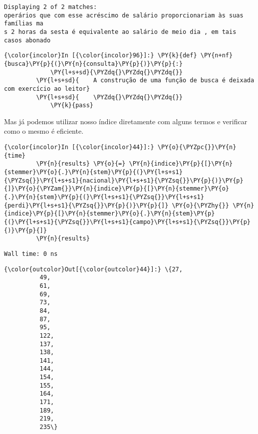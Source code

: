     \begin{Verbatim}[commandchars=\\\{\}]
Displaying 2 of 2 matches:
operários que com esse acréscimo de salário proporcionariam às suas famílias ma
s 2 horas da sesta é equivalente ao salário de meio dia , em tais casos abonado

    \end{Verbatim}

    \begin{Verbatim}[commandchars=\\\{\}]
{\color{incolor}In [{\color{incolor}96}]:} \PY{k}{def} \PY{n+nf}{busca}\PY{p}{(}\PY{n}{consulta}\PY{p}{)}\PY{p}{:}
             \PY{l+s+sd}{\PYZdq{}\PYZdq{}\PYZdq{}}
         \PY{l+s+sd}{    A construção de uma função de busca é deixada com exercício ao leitor}
         \PY{l+s+sd}{    \PYZdq{}\PYZdq{}\PYZdq{}}
             \PY{k}{pass}
\end{Verbatim}

    Mas já podemos utilizar nosso índice diretamente com alguns termos e
verificar como o mesmo é eficiente.

    \begin{Verbatim}[commandchars=\\\{\}]
{\color{incolor}In [{\color{incolor}44}]:} \PY{o}{\PYZpc{}}\PY{n}{time}
         \PY{n}{results} \PY{o}{=} \PY{n}{indice}\PY{p}{[}\PY{n}{stemmer}\PY{o}{.}\PY{n}{stem}\PY{p}{(}\PY{l+s+s1}{\PYZsq{}}\PY{l+s+s1}{nacional}\PY{l+s+s1}{\PYZsq{}}\PY{p}{)}\PY{p}{]}\PY{o}{\PYZam{}}\PY{n}{indice}\PY{p}{[}\PY{n}{stemmer}\PY{o}{.}\PY{n}{stem}\PY{p}{(}\PY{l+s+s1}{\PYZsq{}}\PY{l+s+s1}{perdi}\PY{l+s+s1}{\PYZsq{}}\PY{p}{)}\PY{p}{]} \PY{o}{\PYZhy{}} \PY{n}{indice}\PY{p}{[}\PY{n}{stemmer}\PY{o}{.}\PY{n}{stem}\PY{p}{(}\PY{l+s+s1}{\PYZsq{}}\PY{l+s+s1}{campo}\PY{l+s+s1}{\PYZsq{}}\PY{p}{)}\PY{p}{]}
         \PY{n}{results}
\end{Verbatim}

    \begin{Verbatim}[commandchars=\\\{\}]
Wall time: 0 ns

    \end{Verbatim}

            \begin{Verbatim}[commandchars=\\\{\}]
{\color{outcolor}Out[{\color{outcolor}44}]:} \{27,
          49,
          61,
          69,
          73,
          84,
          87,
          95,
          122,
          137,
          138,
          141,
          144,
          154,
          155,
          164,
          171,
          189,
          219,
          235\}
\end{Verbatim}
        
